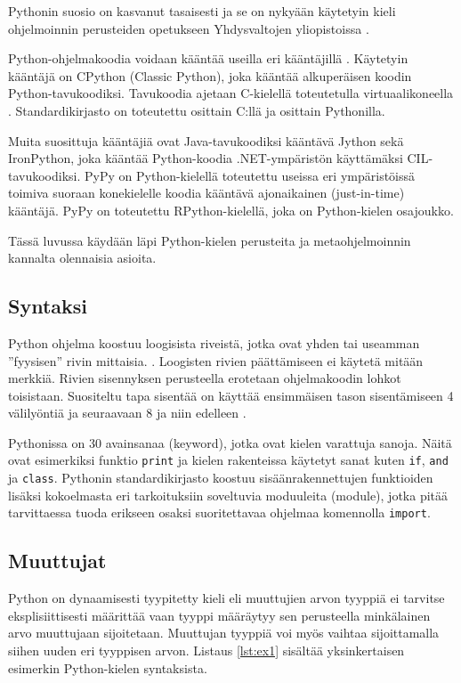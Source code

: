 \documentclass[finnish]{tktltiki2}
\theoremstyle{definition}
\theoremstyle{remark}
\begin{document}
Pythonin suosio on kasvanut tasaisesti ja se on nykyään käytetyin kieli ohjelmoinnin perusteiden opetukseen Yhdysvaltojen yliopistoissa \cite{python-teaching}.

Python-ohjelmakoodia voidaan kääntää useilla eri kääntäjillä \cite{martelli2006python}. Käytetyin kääntäjä on CPython (Classic Python), joka kääntää alkuperäisen koodin Python-tavukoodiksi. Tavukoodia ajetaan C-kielellä toteutetulla virtuaalikoneella \cite{martelli2006python}. Standardikirjasto on toteutettu osittain C:llä ja osittain Pythonilla.

Muita suosittuja kääntäjiä ovat Java-tavukoodiksi kääntävä Jython sekä IronPython, joka kääntää Python-koodia .NET-ympäristön käyttämäksi CIL-tavukoodiksi. PyPy on Python-kielellä toteutettu useissa eri ympäristöissä toimiva suoraan konekielelle koodia kääntävä ajonaikainen (just-in-time) kääntäjä. PyPy on toteutettu RPython-kielellä, joka on Python-kielen osajoukko.

Tässä luvussa käydään läpi Python-kielen perusteita ja metaohjelmoinnin kannalta olennaisia asioita.


\subsection{Syntaksi}

Python ohjelma koostuu loogisista riveistä, jotka ovat yhden tai useamman ''fyysisen'' rivin mittaisia. \cite{martelli2006python}. Loogisten rivien päättämiseen ei käytetä mitään merkkiä. Rivien sisennyksen perusteella erotetaan ohjelmakoodin lohkot toisistaan. Suositeltu tapa sisentää on käyttää ensimmäisen tason sisentämiseen 4 välilyöntiä ja seuraavaan 8 ja niin edelleen \cite{pep8}. 

Pythonissa on 30 avainsanaa (keyword), jotka ovat kielen varattuja sanoja. Näitä ovat esimerkiksi funktio \verb|print| ja kielen rakenteissa käytetyt sanat kuten \verb|if|, \verb|and| ja \verb|class|. Pythonin standardikirjasto koostuu sisäänrakennettujen funktioiden lisäksi kokoelmasta eri tarkoituksiin soveltuvia moduuleita (module), jotka pitää tarvittaessa tuoda erikseen osaksi suoritettavaa ohjelmaa komennolla \verb|import|.



\subsection{Muuttujat}

Python on dynaamisesti tyypitetty kieli eli muuttujien arvon tyyppiä ei tarvitse eksplisiittisesti määrittää vaan tyyppi määräytyy sen perusteella minkälainen arvo muuttujaan sijoitetaan. Muuttujan tyyppiä voi myös vaihtaa sijoittamalla siihen uuden eri tyyppisen arvon. Listaus \ref{lst:ex1} sisältää yksinkertaisen esimerkin Python-kielen syntaksista.
\end{document}
